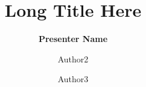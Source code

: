 \documentclass[10pt,UTF8]{beamer}
\title[Short Title]{Long Title Here}
\author[Presenter Name]{\textbf{Presenter Name} \and Author2 \and Author3}
\institute[Fudan University]{
    School of Computer Science, Fudan University, Shanghai, China \\
    Shanghai Key Laboratory of Data Science, Shanghai, China \\
    Shanghai Institute of Intelligent Electronics \& Systems \\~\\
    \tiny{This work is partially supported by xxx}
}
\begin{document}
  \frame{\titlepage}
  
  
  
\end{document}
